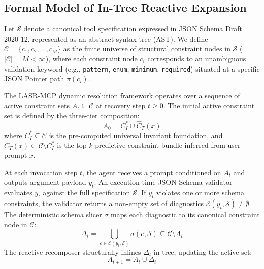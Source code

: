 
\subsection{Formal Model of In-Tree Reactive Expansion}
\label{sec:formal_proof}

Let $\mathcal{S}$ denote a canonical tool specification expressed in JSON Schema Draft 2020-12, represented as an abstract syntax tree (AST). We define $\mathcal{C} = \{c_1, c_2, \dots, c_M\}$ as the finite universe of structural constraint nodes in $\mathcal{S}$ ($|\mathcal{C}| = M < \infty$), where each constraint node $c_i$ corresponds to an unambiguous validation keyword (e.g., \texttt{pattern}, \texttt{enum}, \texttt{minimum}, \texttt{required}) situated at a specific JSON Pointer path $\pi(c_i)$.

The LASR-MCP dynamic resolution framework operates over a sequence of active constraint sets $A_t \subseteq \mathcal{C}$ at recovery step $t \ge 0$. The initial active constraint set is defined by the three-tier composition:
\begin{equation}
A_0 = C_I^* \cup \widehat{C}_T(x)
\end{equation}
where $C_I^* \subseteq \mathcal{C}$ is the pre-computed universal invariant foundation, and $\widehat{C}_T(x) \subseteq \mathcal{C} \setminus C_I^*$ is the top-$k$ predictive constraint bundle inferred from user prompt $x$.

At each invocation step $t$, the agent receives a prompt conditioned on $A_t$ and outputs argument payload $y_t$. An execution-time JSON Schema validator evaluates $y_t$ against the full specification $\mathcal{S}$. If $y_t$ violates one or more schema constraints, the validator returns a non-empty set of diagnostics $\mathcal{E}(y_t, \mathcal{S}) \neq \emptyset$. The deterministic schema slicer $\sigma$ maps each diagnostic to its canonical constraint node in $\mathcal{C}$:
\begin{equation}
\Delta_t = \bigcup_{e \in \mathcal{E}(y_t, \mathcal{S})} \sigma(e, \mathcal{S}) \subseteq \mathcal{C} \setminus A_t
\end{equation}
The reactive recomposer structurally inlines $\Delta_t$ in-tree, updating the active set:
\begin{equation}
A_{t+1} = A_t \cup \Delta_t
\end{equation}

